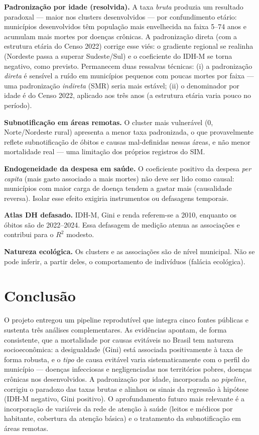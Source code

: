 \documentclass[11pt,a4paper]{article}
\begin{document}
\textbf{Padronização por idade (resolvida).} A taxa \emph{bruta} produzia um resultado
paradoxal --- maior nos clusters desenvolvidos --- por confundimento etário: municípios
desenvolvidos têm população mais envelhecida na faixa 5--74 anos e acumulam mais mortes por
doenças crônicas. A padronização direta (com a estrutura etária do Censo 2022) corrige esse
viés: o gradiente regional se realinha (Nordeste passa a superar Sudeste/Sul) e o coeficiente
do IDH-M se torna negativo, como previsto. Permanecem duas ressalvas técnicas: (i) a
padronização \emph{direta} é sensível a ruído em municípios pequenos com poucas mortes por
faixa --- uma padronização \emph{indireta} (SMR) seria mais estável; (ii) o denominador por
idade é do Censo 2022, aplicado aos três anos (a estrutura etária varia pouco no período).

\textbf{Subnotificação em áreas remotas.} O cluster mais vulnerável (0, Norte/Nordeste rural)
apresenta a menor taxa padronizada, o que provavelmente reflete subnotificação de óbitos e
causas mal-definidas nessas áreas, e não menor mortalidade real --- uma limitação dos próprios
registros do SIM.

\textbf{Endogeneidade da despesa em saúde.} O coeficiente positivo da despesa \emph{per
capita} (mais gasto associado a mais mortes) não deve ser lido como causal: municípios com
maior carga de doença tendem a gastar mais (causalidade reversa). Isolar esse efeito exigiria
instrumentos ou defasagens temporais.

\textbf{Atlas DH defasado.} IDH-M, Gini e renda referem-se a 2010, enquanto os óbitos são de
2022--2024. Essa defasagem de medição atenua as associações e contribui para o $R^2$ modesto.

\textbf{Natureza ecológica.} Os clusters e as associações são de nível municipal. Não se pode
inferir, a partir deles, o comportamento de indivíduos (falácia ecológica).

\section{Conclusão}

O projeto entregou um pipeline reprodutível que integra cinco fontes públicas e sustenta três
análises complementares. As evidências apontam, de forma consistente, que a mortalidade por
causas evitáveis no Brasil tem natureza socioeconômica: a desigualdade (Gini) está
associada positivamente à taxa de forma robusta, e o \emph{tipo} de causa evitável varia
sistematicamente com o perfil do município --- doenças infecciosas e negligenciadas nos
territórios pobres, doenças crônicas nos desenvolvidos. A padronização por idade, incorporada
ao \emph{pipeline}, corrigiu o paradoxo das taxas brutas e alinhou os sinais da regressão à
hipótese (IDH-M negativo, Gini positivo). O aprofundamento futuro mais relevante é a
incorporação de variáveis da rede de atenção à saúde (leitos e médicos por habitante,
cobertura da atenção básica) e o tratamento da subnotificação em áreas remotas.
\end{document}
